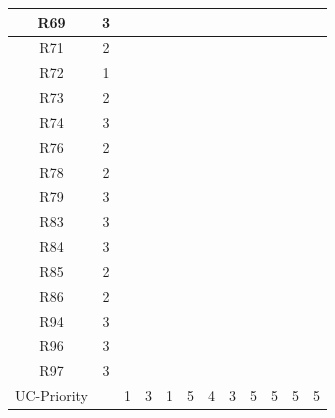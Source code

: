 \documentclass[12pt]{article}
\begin{document}
\begin{longtable}{|c|c|c|c|c|c|c|c|c|c|c|c|}
		\hline
		R69         & 3          &           &           &           &           &           &           &           &           &           &           \\
		\hline
		R71         & 2          &           &           &           &           &           &           &           &           &           &           \\
		\hline
		R72         & 1          &           &           &           &           &           &           &           &           &           &           \\
		\hline
		R73         & 2          &           &           &           &           &           &           &           &           &           &           \\
		\hline
		R74         & 3          &           &           &           &           &           &           &           &           &           &           \\
		\hline
		R76         & 2          &           &           &           &           &           &           &           &           &           &           \\
		\hline
		R78         & 2          &           &           &           &           &           &           &           &           &           &           \\
		\hline
		R79         & 3          &           &           &           &           &           &           &           &           &           &           \\
		\hline
		R83         & 3          &           &           &           &           &           &           &           &           &           &           \\
		\hline
		R84         & 3          &           &           &           &           &           &           &           &           &           &           \\
		\hline
		R85         & 2          &           &           &           &           &           &           &           &           &           &           \\
		\hline
		R86         & 2          &           &           &           &           &           &           &           &           &           &           \\
		\hline
		R94         & 3          &           &           &           &           &           &           &           &           &           &           \\
		\hline
		R96         & 3          &           &           &           &           &           &           &           &           &           &           \\
		\hline
		R97         & 3          &           &           &           &           &           &           &           &           &           &           \\
		\hline
		UC-Priority &            & 1         & 3         & 1         & 5         & 4         & 3         & 5         & 5         & 5         & 5         \\
		\hline
	\end{longtable}
\end{document}
